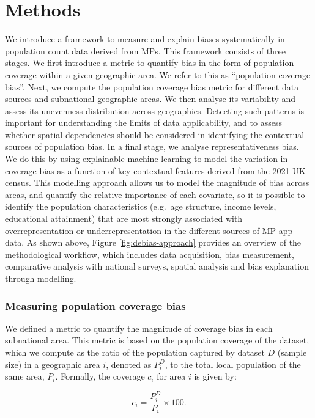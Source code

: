 \documentclass[]{rsos}%
\begin{document}
\section{Methods}\label{methods}

We introduce a framework to measure and explain biases systematically in
population count data derived from MPs. This framework
consists of three stages. We first introduce a metric to quantify bias
in the form of population coverage within a given geographic area. We
refer to this as ``population coverage bias''. Next, we compute the
population coverage bias metric for different data sources and
subnational geographic areas. We then analyse its variability and assess
its unevenness distribution across geographies. Detecting such patterns
is important for understanding the limits of data applicability, and to
assess whether spatial dependencies should be considered in identifying
the contextual sources of population bias. In a final stage, we analyse
representativeness bias. We do this by using explainable machine
learning to model the variation in coverage bias as a function of key
contextual features derived from the 2021 UK census. This modelling
approach allows us to model the magnitude of bias across areas, and
quantify the relative importance of each covariate, so it is possible to
identify the population characteristics (e.g.~age structure, income
levels, educational attainment) that are most strongly associated with
overrepresentation or underrepresentation in the different sources of MP
app data. As shown above, Figure \ref{fig:debias-approach} provides an overview of the methodological workflow,
which includes data acquisition, bias measurement, comparative analysis
with national surveys, spatial analysis and bias explanation through
modelling.

\subsubsection{Measuring population coverage bias}\label{measuring-population-coverage-bias}

We defined a metric to quantify the magnitude of coverage bias in each
subnational area. This metric is based on the population coverage of the
dataset, which we compute as the ratio of the population captured by
dataset \(D\) (sample size) in a geographic area \(i\), denoted as \(P_i^D\),
to the total local population of the same area, \(P_i\). Formally, the
coverage \(c_i\) for area \(i\) is given by:

\begin{equation}
c_i = \dfrac{P_i^D}{P_i} \times 100.
\end{equation}
\end{document}
